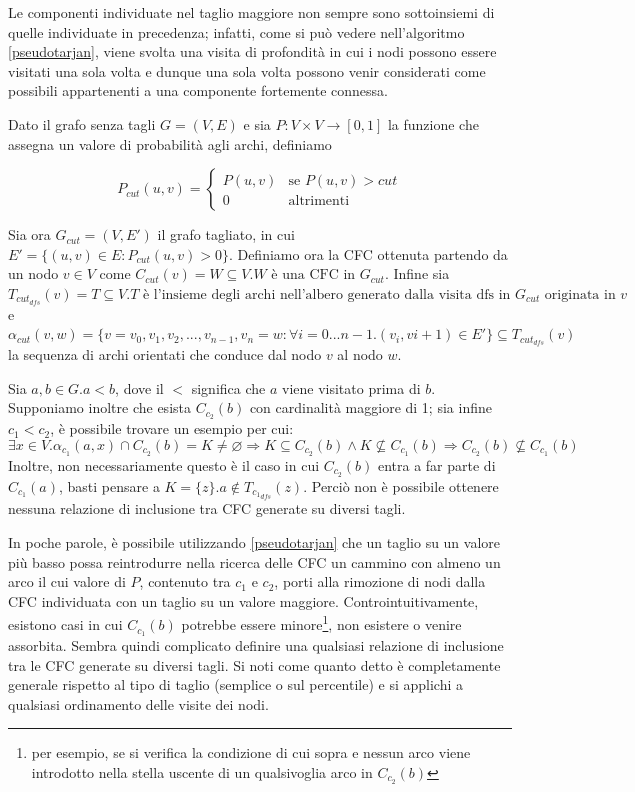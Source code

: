 \documentclass[10pt,a4paper]{article}
\begin{document}
Le componenti individuate nel taglio maggiore non sempre sono sottoinsiemi di quelle individuate in precedenza; infatti, come si può vedere nell'algoritmo \ref{pseudotarjan}, viene svolta una visita di profondità in cui i nodi possono essere visitati una sola volta e dunque una sola volta possono venir considerati come possibili appartenenti a una componente fortemente connessa. 

Dato il grafo senza tagli $G=(V,E)$ e sia $P:V \times V \to [0,1]$ la funzione che assegna un valore di probabilità agli archi, definiamo

$$P_{cut}(u,v) =
\begin{cases}
P(u,v) & \text{se } P(u,v) > cut\\
0 	& \text{altrimenti}
\end{cases}$$

Sia ora $G_{cut}=(V,E')$ il grafo tagliato, in cui $E' = \{(u,v) \in E : P_{cut}(u,v) > 0\}$. Definiamo ora la CFC ottenuta partendo da un nodo $v \in V$ come $C_{cut}( v ) = W \subseteq V. W \text{ è una CFC in } G_{cut} $. Infine sia $ T_{cut_{dfs}}(v) = T \subseteq V . T \text{ è l'insieme degli archi nell'albero generato dalla visita dfs in } G_{cut} \text{ originata in } v $ e $\alpha_{cut} (v, w) = \{ v = v_{0}, v_{1}, v_{2}, ... , v_{n-1}, v_{n} = w : \forall i = 0...n-1 . (v_{i}, v{i+1}) \in E' \}  \subseteq T_{cut_{dfs}}( v )$ la sequenza di archi orientati che conduce dal nodo $v$ al nodo $w$.

Sia $a,b \in G . a < b$, dove il $<$ significa che $a$ viene visitato prima di $b$. Supponiamo inoltre che esista $C_{c_{2}}( b )$ con cardinalità maggiore di 1; sia infine $c_{1} < c_{2}$, è possibile trovare un esempio per cui: 
$$
\exists x \in V . \alpha_{c_{1}}(a, x) \cap C_{c_{2}}( b ) = K \neq \varnothing \Rightarrow K \subseteq C_{c_{2}}( b ) \land K \nsubseteq C_{c_{1}}( b ) \Rightarrow C_{c_{2}}( b ) \nsubseteq C_{c_{1}}( b )
$$
Inoltre, non necessariamente questo è il caso in cui $C_{c_{2}}( b )$ entra a far parte di $C_{c_{1}}( a )$, basti pensare a $K = \{z\} . a \notin T_{{c_{1}}_{dfs}} ( z ) $. Perciò non è possibile ottenere nessuna relazione di inclusione tra CFC generate su diversi tagli.

In poche parole, è possibile utilizzando \ref{pseudotarjan} che un taglio su un valore più basso possa reintrodurre nella ricerca delle CFC un cammino con almeno un arco il cui valore di $P$, contenuto tra $c_{1}$ e $c_{2}$, porti alla rimozione di nodi dalla CFC individuata con un taglio su un valore maggiore. Controintuitivamente, esistono casi in cui $C_{c_{1}}( b )$ potrebbe essere minore\footnote{ per esempio, se si verifica la condizione di cui sopra e nessun arco viene introdotto nella stella uscente di un qualsivoglia arco in $C_{c_2}( b ) $}, non esistere o venire assorbita. Sembra quindi complicato definire una qualsiasi relazione di inclusione tra le CFC generate su diversi tagli.
Si noti come quanto detto è completamente generale rispetto al tipo di taglio (semplice o sul percentile) e si applichi a qualsiasi ordinamento delle visite dei nodi.
\end{document}
